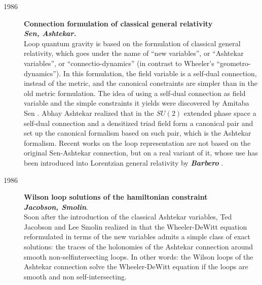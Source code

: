 \documentclass[12pt]{article}
\begin{document}
\begin{description}

	\item[1986] {\bf  Connection formulation of classical general 
 	relativity\\ {\em Sen, Ashtekar.}}\\ 
	Loop quantum gravity is based on the formulation of classical 
	general relativity, which goes under the name of ``new 
	variables'', or ``Ashtekar variables'', or ``connectio-dynamics'' 
	(in contrast to Wheeler's ``geometro-dynamics'').  In this 
	formulation, the field variable is a self-dual connection, instead 
	of the metric, and the canonical constraints are simpler than in 
	the old metric formulation.  The idea of using a self-dual 
	connection as field variable and the simple constraints it yields 
	were discovered by Amitaba Sen \cite{Sen}.  Abhay Ashtekar 
	realized that in the $SU(2)$ extended phase space a self-dual 
	connection and a densitized triad field form a canonical pair 
	\cite{Ashtekar86,Ashtekar87} and set up the canonical formalism 
	based on such pair, which is the Ashtekar formalism.  Recent works 
	on the loop representation are not based on the original 
	Sen-Ashtekar connection, but on a real variant of it, whose use 
	has been introduced into Lorentzian general relativity by 
	\textbf{\em Barbero} \cite{Barbero,Barbero3,Barbero2,Barbero4}.

	\item[1986] {\bf  Wilson loop solutions of the hamiltonian 
	constraint\\ {\em Jacobson, Smolin}}.\\ Soon after 
	the introduction of the classical Ashtekar variables, Ted 
	Jacobson and Lee Smolin realized in \cite{JacobsonSmolin} 
	that the Wheeler-DeWitt equation reformulated in terms of the 
	new variables admits a simple class of exact solutions: the 
	traces of the holonomies of the Ashtekar connection around 
	smooth non-selfintersecting loops.  In other words: the 
	Wilson loops of the Ashtekar connection solve the 
	Wheeler-DeWitt equation if the loops are smooth and non 
	self-intersecting.


\end{description}
\end{document}
